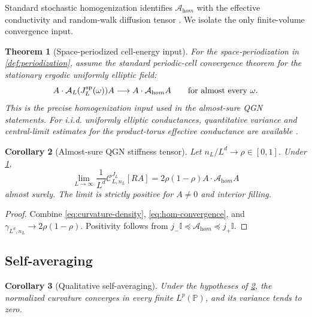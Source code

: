\documentclass[11pt]{article}
\newtheorem{theorem}{Theorem}[section]
\newtheorem{corollary}[theorem]{Corollary}
\theoremstyle{definition}
\theoremstyle{remark}
\newcommand{\Id}{\mathbb I}
\newcommand{\Prob}{\mathbb P}
\newcommand{\cC}{\mathcal C}
\newcommand{\cA}{\mathcal A}
\begin{document}
Standard stochastic homogenization identifies $\cA_{\mathrm hom}$ with the effective conductivity and random-walk diffusion tensor \cite{Kozlov1979,PapanicolaouVaradhan1979}.  We isolate the only finite-volume convergence input.

\begin{theorem}[Space-periodized cell-energy input]
\label{thm:hom-input}
For the space-periodization in \cref{def:periodization}, assume the standard periodic-cell convergence theorem for the stationary ergodic uniformly elliptic field:
\begin{equation}
 A\cdot\cA_L(J_L^{\rm sp}(\omega))A
 \longrightarrow A\cdot\cA_{\mathrm hom}A
 \qquad\text{for almost every }\omega.
 \label{eq:hom-convergence}
\end{equation}
This is the precise homogenization input used in the almost-sure QGN statements.  For i.i.d. uniformly elliptic conductances, quantitative variance and central-limit estimates for the product-torus effective conductance are available \cite{GloriaOtto2011,GloriaNolen2016}.
\end{theorem}

\begin{corollary}[Almost-sure QGN stiffness tensor]
\label{cor:qgn-hom}
Let $n_L/L^d\to\rho\in[0,1]$.  Under \cref{thm:hom-input},
\begin{equation}
 \boxed{
 \lim_{L\to\infty}\frac1{L^d}
 \cC_{L,n_L}^{J_L}[RA]
 =2\rho(1-\rho)A\cdot\cA_{\mathrm hom}A}
 \label{eq:qgn-hom}
\end{equation}
almost surely.  The limit is strictly positive for $A\ne0$ and interior filling.
\end{corollary}

\begin{proof}
Combine \eqref{eq:curvature-density}, \eqref{eq:hom-convergence}, and
$\gamma_{L^d,n_L}\to2\rho(1-\rho)$.  Positivity follows from
$j_-\Id\preceq\cA_{\mathrm hom}\preceq j_+\Id$.
\end{proof}

\subsection{Self-averaging}

\begin{corollary}[Qualitative self-averaging]
\label{cor:self-average}
Under the hypotheses of \cref{cor:qgn-hom}, the normalized curvature converges in every finite $L^p(\Prob)$, and its variance tends to zero.
\end{corollary}
\end{document}
